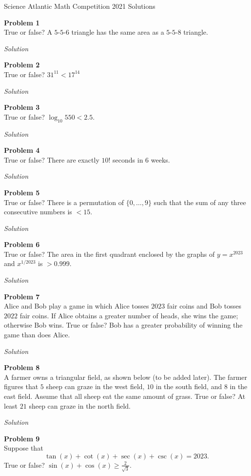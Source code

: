 \documentclass{amsart}
\begin{document}
\begin{center}
Science Atlantic Math Competition 2021 Solutions
\end{center}

\textbf{Problem 1}\\
True or false? A $5$-$5$-$6$ triangle has the same area as a $5$-$5$-$8$ triangle.

\textit{Solution}

\textbf{Problem 2}\\
True or false? $31^{11} < 17^{14}$

\textit{Solution}

\textbf{Problem 3}\\
True or false? $\log_10{550} < 2.5$.

\textit{Solution}

\textbf{Problem 4}\\
True or false? There are exactly $10!$ seconds in $6$ weeks.

\textit{Solution}

\textbf{Problem 5}\\
True or false? There is a permutation of $\{0,\dots,9\}$ such that the sum of any three consecutive numbers is $<15$.

\textit{Solution}

\textbf{Problem 6}\\
True or false? The area in the first quadrant enclosed by the graphs of $y = x^{2023}$ and $x^{1/2023}$ is $>0.999$.

\textit{Solution}

\textbf{Problem 7}\\
Alice and Bob play a game in which Alice tosses $2023$ fair coins and Bob tosses $2022$ fair coins.
If Alice obtains a greater number of heads, she wins the game; otherwise Bob wins.
True or false? Bob has a greater probability of winning the game than does Alice.

\textit{Solution}

\textbf{Problem 8}\\
A farmer owns a triangular field, as shown below ({\color{red}to be added later}).
The farmer figures that $5$ sheep can graze in the west field, $10$ in the south field, and $8$ in the east field.
Assume that all sheep eat the same amount of grass.
True or false? At least $21$ sheep can graze in the north field.

\textit{Solution}

\textbf{Problem 9}\\
Suppose that
\[ \tan(x) + \cot(x) + \sec(x) + \csc(x) = 2023. \]
True or false? $\sin(x) + \cos(x) \geq \frac{2}{\sqrt{3}}$.
\end{document}

